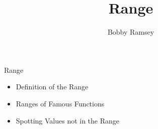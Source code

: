 \documentclass{ximera}
\author{Bobby Ramsey}
\title{Range}
\begin{document}
\begin{abstract}
\end{abstract}
\maketitle


\begin{objectives}

\item Range
\begin{itemize}
	\item Definition of the Range
	\item Ranges of Famous Functions 
	\item Spotting Values not in the Range
\end{itemize}



\end{objectives}
\end{document}
